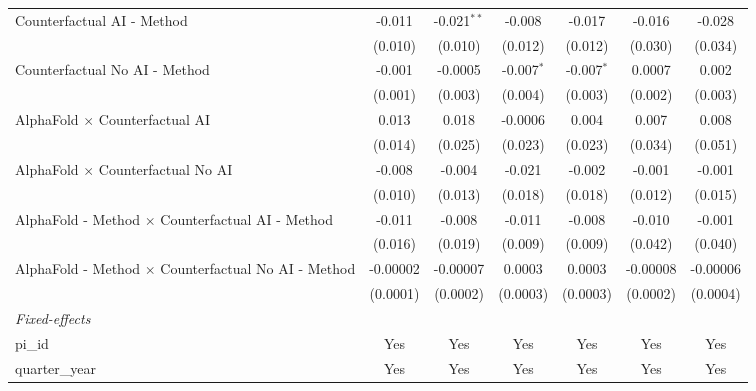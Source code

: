 \begin{tabular}{lcccccc}
   Counterfactual AI - Method                                 & -0.011        & -0.021$^{**}$ & -0.008       & -0.017        & -0.016   & -0.028\\   
                                                              & (0.010)       & (0.010)       & (0.012)      & (0.012)       & (0.030)  & (0.034)\\   
   Counterfactual No AI - Method                              & -0.001        & -0.0005       & -0.007$^{*}$ & -0.007$^{*}$  & 0.0007   & 0.002\\   
                                                              & (0.001)       & (0.003)       & (0.004)      & (0.003)       & (0.002)  & (0.003)\\   
   AlphaFold $\times$ Counterfactual AI                       & 0.013         & 0.018         & -0.0006      & 0.004         & 0.007    & 0.008\\   
                                                              & (0.014)       & (0.025)       & (0.023)      & (0.023)       & (0.034)  & (0.051)\\   
   AlphaFold $\times$ Counterfactual No AI                    & -0.008        & -0.004        & -0.021       & -0.002        & -0.001   & -0.001\\   
                                                              & (0.010)       & (0.013)       & (0.018)      & (0.018)       & (0.012)  & (0.015)\\   
   AlphaFold - Method $\times$ Counterfactual AI - Method     & -0.011        & -0.008        & -0.011       & -0.008        & -0.010   & -0.001\\   
                                                              & (0.016)       & (0.019)       & (0.009)      & (0.009)       & (0.042)  & (0.040)\\   
   AlphaFold - Method $\times$ Counterfactual No AI - Method  & -0.00002      & -0.00007      & 0.0003       & 0.0003        & -0.00008 & -0.00006\\   
                                                              & (0.0001)      & (0.0002)      & (0.0003)     & (0.0003)      & (0.0002) & (0.0004)\\   
   \midrule
   \emph{Fixed-effects}\\
   pi\_id                                                     & Yes           & Yes           & Yes          & Yes           & Yes      & Yes\\  
   quarter\_year                                              & Yes           & Yes           & Yes          & Yes           & Yes      & Yes\\  

\end{tabular}

